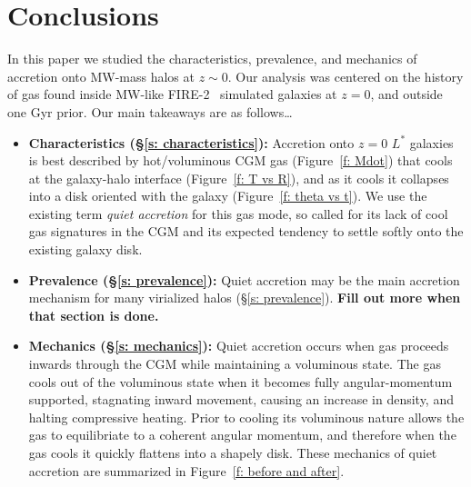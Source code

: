 \documentclass[fleqn,usenatbib]{mnras}
\begin{document}




\section{Conclusions}
\label{s: conclusions}

In this paper we studied the characteristics, prevalence, and mechanics of accretion onto MW-mass halos at $z \sim 0$.
Our analysis was centered on the history of gas found inside MW-like FIRE-2~\citep{Hopkins2018} simulated galaxies at $z=0$, and outside one Gyr prior.
Our main takeaways are as follows\ldots
\begin{itemize}
    \item \textbf{Characteristics (\S\ref{s: characteristics}):}
    Accretion onto $z=0$ $L^*$ galaxies is best described by hot/voluminous CGM gas (Figure~\ref{f: Mdot}) that cools at the galaxy-halo interface (Figure~\ref{f: T vs R}), and as it cools it collapses into a disk oriented with the galaxy (Figure~\ref{f: theta vs t}).
    We use the existing term \textit{quiet accretion} for this gas mode, so called for its lack of cool gas signatures in the CGM and its expected tendency to settle softly onto the existing galaxy disk.
    \item \textbf{Prevalence (\S\ref{s: prevalence}):} Quiet accretion may be the main accretion mechanism for many virialized halos (\S\ref{s: prevalence}).
    \textbf{Fill out more when that section is done.}
    \item \textbf{Mechanics (\S\ref{s: mechanics}):}
    Quiet accretion occurs when gas proceeds inwards through the CGM while maintaining a voluminous state.
    The gas cools out of the voluminous state when it becomes fully angular-momentum supported, stagnating inward movement, causing an increase in density, and halting compressive heating.
    Prior to cooling its voluminous nature allows the gas to equilibriate to a coherent angular momentum, and therefore when the gas cools it quickly flattens into a shapely disk.
    These mechanics of quiet accretion are summarized in Figure~\ref{f: before and after}.
\end{itemize}
\end{document}
